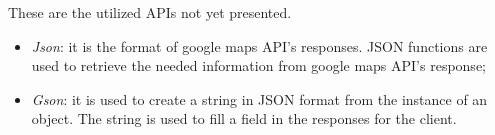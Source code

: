 These are the utilized APIs not yet presented.
\begin{itemize}
\item \textit{Json}: it is the format of google maps API’s responses. JSON functions are used to retrieve the needed information from google maps API’s response;
\item \textit{Gson}: it is used to create a string in JSON format from the instance of an object. The string is used to fill a field in the responses for the client. 
\end{itemize}
